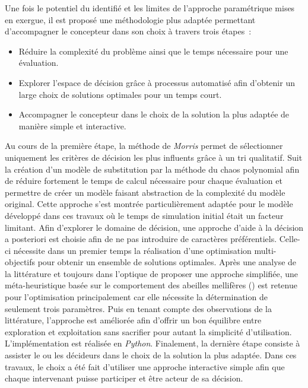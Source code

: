 Une fois le potentiel du  identifié et les limites de l’approche paramétrique
mises en exergue, il est proposé une méthodologie plus adaptée permettant d’accompagner
le concepteur dans son choix à travers trois étapes~:
\begin{itemize}
    \item Réduire la complexité du problème ainsi que le temps nécessaire pour une évaluation.
    \item Explorer l’espace de décision grâce à processus automatisé afin d’obtenir
          un large choix de solutions optimales pour un temps court.
    \item Accompagner le concepteur dans le choix de la solution la plus adaptée
          de manière simple et interactive.
\end{itemize}
Au cours de la première étape, la méthode de \textit{Morris} permet de sélectionner uniquement
les critères de décision les plus influents grâce à un tri qualitatif. Suit la création
d’un modèle de substitution par la méthode du chaos polynomial afin de réduire fortement le temps
de calcul nécessaire
pour chaque évaluation et permettre de créer un modèle faisant abstraction de la complexité du modèle original.
Cette approche s’est montrée particulièrement adaptée pour le
modèle développé dans ces travaux où le temps de simulation initial était un facteur
limitant. Afin d’explorer le domaine de décision, une approche d’aide à la décision a
posteriori est choisie afin de ne pas introduire de caractères préférentiels. Celle-ci
nécessite dans un premier temps la réalisation d’une optimisation multi-objectifs pour
obtenir un ensemble de solutions optimales. Après une analyse de la littérature et
toujours dans l’optique de proposer une approche simplifiée, une méta-heuristique basée sur
le comportement des abeilles mellifères () est retenue pour l’optimisation principalement car
elle nécessite la détermination de seulement trois paramètres. Puis en tenant compte des observations
de la littérature, l’approche est améliorée afin d’offrir un bon équilibre entre exploration
et exploitation sans sacrifier pour autant la simplicité d’utilisation. L’implémentation est
réalisée en \textit{Python}.
Finalement, la dernière étape consiste à assister le ou les décideurs dans le choix de la
solution la plus adaptée. Dans ces travaux, le choix a été fait d’utiliser une approche
interactive simple afin que chaque intervenant puisse participer et être acteur de sa
décision.

